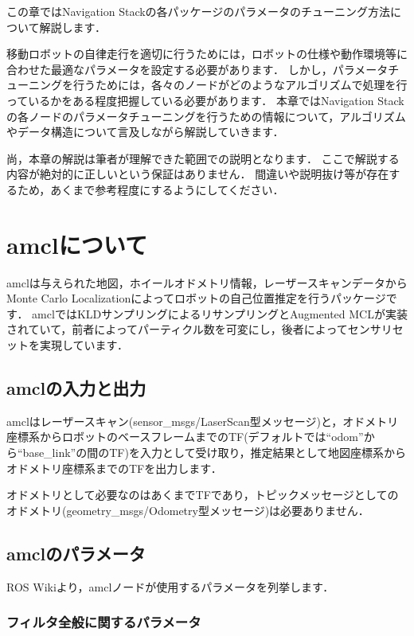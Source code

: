 \documentclass[{../../master}]{subfiles}
\begin{document}
この章ではNavigation Stackの各パッケージのパラメータのチューニング方法について解説します．

移動ロボットの自律走行を適切に行うためには，ロボットの仕様や動作環境等に合わせた最適なパラメータを設定する必要があります．
しかし，パラメータチューニングを行うためには，各々のノードがどのようなアルゴリズムで処理を行っているかをある程度把握している必要があります．
本章ではNavigation Stackの各ノードのパラメータチューニングを行うための情報について，アルゴリズムやデータ構造について言及しながら解説していきます．

尚，本章の解説は筆者が理解できた範囲での説明となります．
ここで解説する内容が絶対的に正しいという保証はありません．
間違いや説明抜け等が存在するため，あくまで参考程度にするようにしてください．

\section{\textsf{amcl}について}

\textsf{amcl}は与えられた地図，ホイールオドメトリ情報，レーザースキャンデータからMonte Carlo Localizationによってロボットの自己位置推定を行うパッケージです．
\textsf{amcl}ではKLDサンプリングによるリサンプリング\cite{amcl}とAugmented MCL\cite{thrun2005probabilistic}が実装されていて，前者によってパーティクル数を可変にし，後者によってセンサリセットを実現しています．

\subsection{\textsf{amcl}の入力と出力}

\textsf{amcl}はレーザースキャン(\textsf{sensor\_msgs/LaserScan}型メッセージ)と，オドメトリ座標系からロボットのベースフレームまでのTF(デフォルトでは``odom''から``base\_link''の間のTF)を入力として受け取り，推定結果として地図座標系からオドメトリ座標系までのTFを出力します．

オドメトリとして必要なのはあくまでTFであり，トピックメッセージとしてのオドメトリ(\textsf{geometry\_msgs/Odometry}型メッセージ)は必要ありません．

\subsection{\textsf{amcl}のパラメータ}

ROS Wikiより，\textsf{amcl}ノードが使用するパラメータを列挙します．

\subsubsection{フィルタ全般に関するパラメータ}
\end{document}
